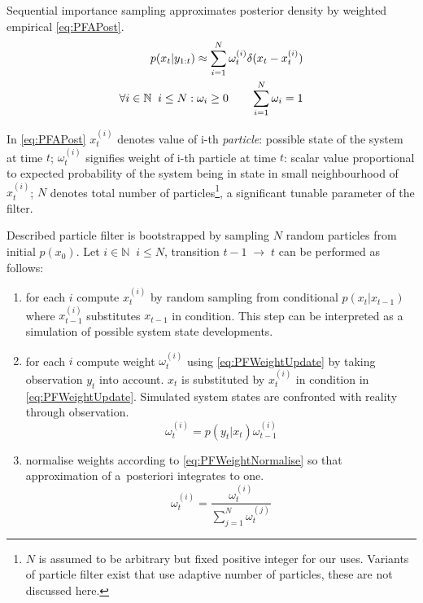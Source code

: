 Sequential importance sampling approximates posterior density by weighted empirical
{\pdf} \eqref{eq:PFAPost}.
\begin{align}
	p(x_t | y_{1:t}) \approx \sum_{i=1}^N \omega_t^{(i)} \delta(x_t - x_t^{(i)}) \label{eq:PFAPost} \\
	\forall i \in \mathbb{N} \;\; i \leq N: \omega_i \geq 0 \quad\quad \sum_{i=1}^N \omega_i = 1 \notag
\end{align}

In \eqref{eq:PFAPost} \(x_t^{(i)}\) denotes value of i-th \emph{particle}: possible state of the
system at time \(t\);
\(\omega_t^{(i)}\) signifies weight of i-th particle at time \(t\): scalar value proportional to
expected probability of the system being in state in small neighbourhood of \(x_t^{(i)}\);
\(N\) denotes total number of particles\footnote{\(N\) is assumed to be
arbitrary but fixed positive integer for our uses. Variants of particle filter exist that use
adaptive number of particles, these are not discussed here.}, a significant tunable parameter
of the filter.

Described particle filter is bootstrapped by sampling \(N\) random particles from initial {\pdf}
\(p(x_0)\). Let \(i \in \mathbb{N} \;\; i \leq N\), transition \(t-1 \; \rightarrow \; t\) can be
performed as follows:
\begin{enumerate}
	\item for each \(i\) compute \(x_t^{(i)}\) by random sampling from conditional {\pdf}
		\(p(x_t|x_{t-1})\) where \(x_{t-1}^{(i)}\) substitutes \(x_{t-1}\) in condition. This step
		can be interpreted as a simulation of possible system state developments.
	\item for each \(i\) compute weight \(\omega_t^{(i)}\) using \eqref{eq:PFWeightUpdate}
		by taking observation \(y_t\) into account. \(x_t\) is substituted by \(x_t^{(i)}\) in
		condition in \eqref{eq:PFWeightUpdate}. Simulated system states are confronted with reality
		through observation.
		\begin{equation} \label{eq:PFWeightUpdate}
			\omega_t^{(i)} = p(y_t | x_t) \omega_{t-1}^{(i)}
		\end{equation}
	\item normalise weights according to \eqref{eq:PFWeightNormalise} so that approximation of
		a~posteriori {\pdf} integrates to one.
		\begin{equation} \label{eq:PFWeightNormalise}
			\omega_t^{(i)} = \frac{\omega_t^{(i)}}{\sum_{j=1}^N \omega_t^{(j)}}
		\end{equation}
\end{enumerate}


